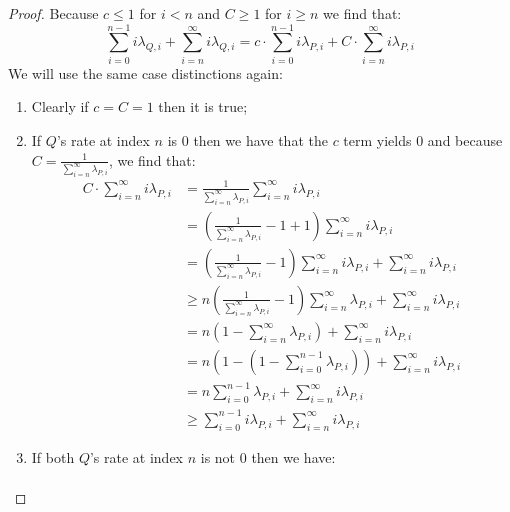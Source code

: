 \begin{proof}
  Because $c \leq 1$ for $i < n$ and $C \geq 1$ for $i \geq n$ we find that:
  $$
   \sum_{i=0}^{n-1} i \lambda_{Q,i} + \sum_{i=n}^\infty i \lambda_{Q,i} =
   c \cdot \sum_{i=0}^{n-1} i \lambda_{P,i} + C \cdot \sum_{i=n}^\infty i \lambda_{P,i}
  $$
  We will use the same case distinctions again:
  \begin{enumerate}
   \item Clearly if $c = C = 1$ then it is true;
   \item If $Q$'s rate at index $n$ is $0$ then we have that the $c$ term yields $0$
   and because $C = \frac{1}{\sum_{i=n}^{\infty}\lambda_{P,i}}$, we find that:
   \begin{align*}
     C \cdot \sum_{i=n}^\infty i \lambda_{P,i} &= \frac{1}{\sum_{i=n}^{\infty}\lambda_{P,i}}\sum_{i=n}^\infty i \lambda_{P,i}\\
     &= (\frac{1}{\sum_{i=n}^{\infty}\lambda_{P,i}} - 1 + 1)\sum_{i=n}^\infty i \lambda_{P,i}\\
     &= (\frac{1}{\sum_{i=n}^{\infty}\lambda_{P,i}} - 1)\sum_{i=n}^\infty i \lambda_{P,i} + \sum_{i=n}^\infty i \lambda_{P,i}\\
     &\geq n(\frac{1}{\sum_{i=n}^{\infty}\lambda_{P,i}} - 1)\sum_{i=n}^\infty \lambda_{P,i} + \sum_{i=n}^\infty i \lambda_{P,i}\\
     &= n(1 - \sum_{i=n}^\infty \lambda_{P,i}) + \sum_{i=n}^\infty i \lambda_{P,i}\\
     &= n(1 - (1-\sum_{i=0}^{n-1} \lambda_{P,i})) + \sum_{i=n}^\infty i \lambda_{P,i}\\
     &= n\sum_{i=0}^{n-1} \lambda_{P,i} + \sum_{i=n}^\infty i \lambda_{P,i}\\
     &\geq \sum_{i=0}^{n-1}i \lambda_{P,i} + \sum_{i=n}^\infty i \lambda_{P,i}
   \end{align*}
   \item If both $Q$'s rate at index $n$ is not $0$ then we have:
   \begin{align*}

\end{align*}
\end{enumerate}
\end{proof}

